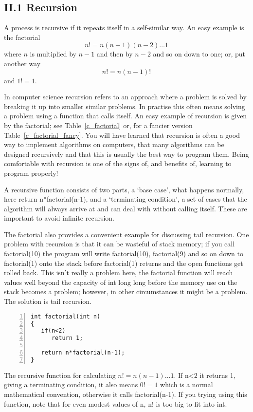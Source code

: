 \documentclass[11pt,a4paper]{scrartcl}
\begin{document}
\subsection*{II.1 Recursion}

A process is recursive if it repeats itself in a self-similar way. An
easy example is the factorial
\begin{equation}
n!=n(n-1)(n-2)\ldots 1
\end{equation}
where $n$ is multiplied by $n-1$ and then by $n-2$ and so on down to one; or, put another way
\begin{equation}
n!=n(n-1)!
\end{equation}
and $1!=1$.

In computer science recursion refers to an approach where a problem is
solved by breaking it up into smaller similar problems. In practise
this often means solving a problem using a function that calls
itself. An easy example of recursion is given by the factorial; see
Table~\ref{c_factorial} or, for a fancier version
Table~\ref{c_factorial_fancy}. You will have learned that recursion is
often a good way to implement algorithms on computers, that many
algorithms can be designed recursively and that this is usually the
best way to program them. Being comfortable with recursion is one of
the signs of, and benefits of, learning to program properly!

A recursive function consists of two parts, a \lq{}base case\rq{},
what happens normally, here return n*factorial(n-1), and a
\lq{}terminating condition\rq{}, a set of cases that the algorithm
will always arrive at and can deal with without calling itself. These
are important to avoid infinite recursion.

The factorial also provides a convenient example for discussing tail
recursion. One problem with recursion is that it can be wasteful of
stack memory; if you call factorial(10) the program will write
factorial(10), factorial(9) and so on down to factorial(1) onto the
stack before factorial(1) returns and the open functions get rolled
back. This isn't really a problem here, the factorial function will
reach values well beyond the capacity of int long long before the
memory use on the stack becomes a problem; however, in other
circumstances it might be a problem. The solution is tail recursion.

\begin{table}[b]
\begin{lstlisting}[numbers=left]
int factorial(int n)
{
   if(n<2)
      return 1;

   return n*factorial(n-1);
}

\end{lstlisting}
\caption{The recursive function for calculating $n!=n(n-1)\ldots 1$. If n<2 it returns 1, giving a terminating condition, it also means $0!=1$ which is a normal mathematical convention, otherwise it calls factorial(n-1). If you trying using this function, note that for even modest values of n, n! is too big to fit into int.\label{c_factorial}}
\end{table}
\end{document}
